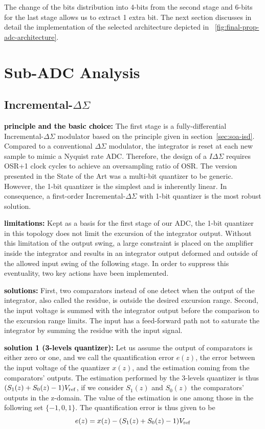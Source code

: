 The change of the bits distribution into 4-bits from the second stage and 6-bits for the last stage allows us to extract 1 extra bit. The next section discusses in detail the implementation of the selected architecture depicted in \figurename~\ref{fig:final-prop-adc-architecture}.

\section{Sub-ADC Analysis}
\subsection{Incremental-\(\Delta\Sigma \)} %

\textbf{\textcolor{black}{principle and the basic choice:}}
The first stage is a fully-differential Incremental-\(\Delta\Sigma \) modulator based on the principle given in section~\ref{sec:soa-isd}.
Compared to a conventional $\Delta\Sigma$ modulator, the integrator is reset at each new sample to mimic a Nyquist rate ADC\@. Therefore, the design of a \(I\Delta\Sigma \) requires OSR+1 clock cycles to achieve an oversampling ratio of OSR\@. The version presented in the State of the Art was a multi-bit quantizer to be generic. However, the 1-bit quantizer is the simplest and is inherently linear. In consequence, a first-order Incremental-$\Delta\Sigma$ with 1-bit quantizer is the most robust solution.

\textbf{\textcolor{black}{limitations:}}
Kept as a basis for the first stage of our ADC, the 1-bit quantizer in this topology does not limit the excursion of the integrator output. Without this limitation of the output swing, a large constraint is placed on the amplifier inside the integrator and results in an integrator output deformed and outside of the allowed input swing of the following stage. In order to suppress this eventuality, two key actions have been implemented.

\textbf{\textcolor{black}{solutions:}}
First, two comparators instead of one detect when the output of the integrator, also called the residue, is outside the desired excursion range. Second, the input voltage is summed with the integrator output before the comparison to the excursion range limits. The input has a feed-forward path not to saturate the integrator by summing the residue with the input signal.

\textbf{\textcolor{black}{solution 1 (3-levels quantizer):}}
Let us assume the output of comparators is either zero or one, and we call the quantification error $e(z)$, the error between the input voltage of the quantizer $x(z)$, and the estimation coming from the comparators' outputs. The estimation performed by the 3-levels quantizer is thus \((S_1(z)+S_0(z)-1)V_{\rm ref} \), if we consider $S_1(z)$ and $S_0(z)$ the comparators' outputs in the z-domain. The value of the estimation is one among those in the following set \(\{-1,0,1\}\). The quantification error is thus given to be
\begin{equation} 
	e(z) = x(z) - (S_1(z)+S_0(z)-1)V_{\rm ref}
\end{equation}

